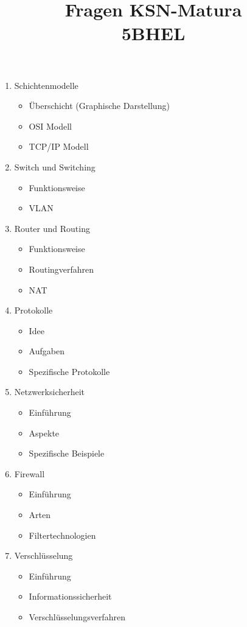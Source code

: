 \documentclass[a4paper]{report}
\title{Fragen KSN-Matura \\5BHEL}
\begin{document}
\maketitle
\begin{enumerate}
\item Schichtenmodelle \\
\begin{itemize}
\item Überschicht (Graphische Darstellung)
\item OSI Modell
\item TCP/IP Modell
\end{itemize}
\item Switch und Switching
\begin{itemize}
\item Funktionsweise
\item VLAN
\end{itemize}
\item Router und Routing
\begin{itemize}
\item Funktionsweise
\item Routingverfahren
\item NAT
\end{itemize}
\item Protokolle
\begin{itemize}
\item Idee
\item Aufgaben
\item Spezifische Protokolle
\end{itemize}
\item Netzwerksicherheit
\begin{itemize}
\item Einführung
\item Aspekte
\item Spezifische Beispiele
\end{itemize}
\item Firewall
\begin{itemize}
\item Einführung
\item Arten
\item Filtertechnologien
\end{itemize}
\item Verschlüsselung
\begin{itemize}
\item Einführung
\item Informationssicherheit
\item Verschlüsselungsverfahren

\end{itemize}
\end{enumerate}
\end{document}
